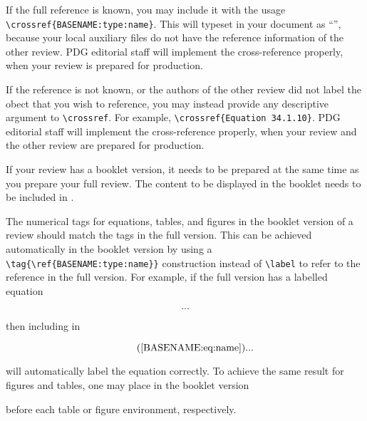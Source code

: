 If the full  reference is known, you may include it with the usage \\
\lstinline!\crossref{BASENAME:type:name}!. 
This will typeset in your document as ``'', because your local auxiliary files do not have the reference information of the other review.
PDG editorial staff will implement the cross-reference properly, when your review is prepared for production.

If the  reference is not known, or the authors of the other review did not label the obect that you wish to reference, 
you may instead provide any descriptive argument to \lstinline{\crossref}. 
For example, \lstinline!\crossref{Equation 34.1.10}!.  
PDG editorial staff will implement the cross-reference properly, when your review and the other review are prepared for production.

If your review has a booklet version, it needs to be prepared at the same time as you prepare your full review.
The content to be displayed in the booklet needs to be included in . 

The numerical tags for equations, tables, and figures in the booklet version of a review should match the tags in the full version. 
This can be achieved automatically in the booklet version by using a \lstinline!\tag{\ref{BASENAME:type:name}}! construction instead of \lstinline{\label}
to refer to the reference in the full version.
For example, if the full version has a labelled equation
\begin{verbtex}
\begin{equation}
	\label{BASENAME:eq:name}
	...
\end{equation}
\end{verbtex}
then including in 
\begin{verbtex}
\begin{equation}
	\tag{\ref{BASENAME:eq:name}}
	...
\end{equation}
\end{verbtex}
will automatically label the equation correctly. 
To achieve the same result for figures and tables, one may place in the booklet version
\begin{verbtex}
	\renewcommand{\thetable}{\ref{BASENAME:type:name}}
	\renewcommand{\thefigure}{\ref{BASENAME:type:name}}
\end{verbtex}
before each table or figure environment, respectively. 


